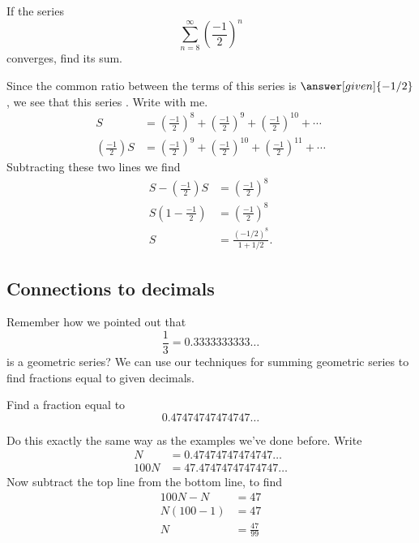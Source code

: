\documentclass{ximera}
\begin{document}
\begin{example}
If the series 
\[
\sum_{n=8}^\infty \left(\frac{-1}{2}\right)^n
\]
converges, find its sum.
\begin{explanation}
  Since the common ratio between the terms of this series is
$\answer[given]{-1/2}$, we see that this series
. Write with me.
\begin{align*}
  S &= \left(\frac{-1}{2}\right)^{8} + \left(\frac{-1}{2}\right)^{9} + \left(\frac{-1}{2}\right)^{10} + \cdots\\
  \left(\frac{-1}{2}\right) S &= \left(\frac{-1}{2}\right)^{9} + \left(\frac{-1}{2}\right)^{10} + \left(\frac{-1}{2}\right)^{11} + \cdots
\end{align*}
Subtracting these two lines we find
\begin{align*}
  S -  \left(\frac{-1}{2}\right) S  &= \left(\frac{-1}{2}\right)^{8}\\
  S\left(1-\frac{-1}{2}\right) &= \left(\frac{-1}{2}\right)^{8}\\
  S &= \frac{(-1/2)^{8}}{1+1/2}.
\end{align*}
\end{explanation}
\end{example}


\subsection{Connections to decimals}

Remember how we pointed out that 
\[
\frac{1}{3} = 0.3333333333\dots
\]
is a geometric series? We can use our techniques for summing geometric
series to find fractions equal to given decimals.

\begin{example}
  Find a fraction equal to
  \[
  0.47474747474747\dots
  \]
  \begin{explanation}
    Do this exactly the same way as the examples we've done
    before. Write
    \begin{align*}
    N &=      0.47474747474747\dots\\
    100 N &= 47.47474747474747\dots
    \end{align*}
    Now subtract the top line from the bottom line, to find
    \begin{align*}
      100N - N &= 47\\
      N(100-1) &= 47\\
      N &= \frac{47}{99}
    \end{align*}
  \end{explanation}
\end{example}
\end{document}
